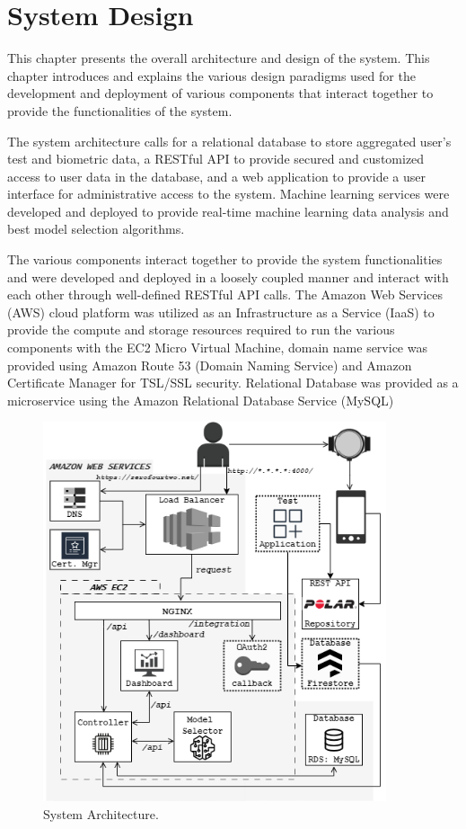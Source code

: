 \chapter{System Design}

This chapter presents the overall architecture and design of the system. This chapter introduces and explains the various design 
paradigms used for the development and deployment of various components that interact together to provide the functionalities of the system. 

The system architecture calls for a relational database to store aggregated user's test and biometric data, a RESTful API to provide secured 
and customized access to user data in the database, and a web application to provide a user interface for administrative access to the 
system. Machine learning services were developed and deployed to provide real-time machine learning data analysis and best model selection 
algorithms.

The various components interact together to provide the system functionalities and were developed and deployed in a loosely coupled manner and
interact with each other through well-defined RESTful API calls.  The Amazon Web Services (AWS) cloud platform was utilized as an Infrastructure
as a Service (IaaS) to provide the compute and storage resources required to run the various components with the EC2 Micro Virtual Machine, 
domain name service was provided using Amazon Route 53 (Domain Naming Service) and Amazon Certificate Manager for TSL/SSL security. Relational 
Database was provided as a microservice using the Amazon Relational Database Service (MySQL)

\begin{figure}[h!]
    \includegraphics[width=0.9\textwidth]{images/sys_architecture.png}
    \caption{System Architecture.}
    \label{image:sys_architecture}
\end{figure}

